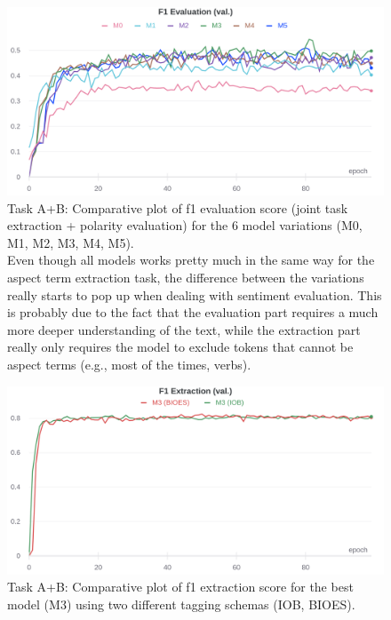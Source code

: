 \documentclass[11pt,a4paper]{article}
\begin{document}
	\begin{figure}[H]
		\centering
		\includegraphics[width=1\columnwidth]{ab_comparative_f1_eval.png}
		\caption{Task A+B: Comparative plot of f1 evaluation score (joint task extraction + polarity evaluation) for the 6 model variations (M0, M1, M2, M3, M4, M5). \\ Even though all models works pretty much in the same way for the aspect term extraction task, the difference between the variations really starts to pop up when dealing with sentiment evaluation. This is probably due to the fact that the evaluation part requires a much more deeper understanding of the text, while the extraction part really only requires the model to exclude tokens that cannot be aspect terms (e.g., most of the times, verbs).}
		\label{fig:comparative_f1_eval}
	\end{figure}
	
	\begin{figure}[H]
		\centering
		\includegraphics[width=1\columnwidth]{M3_ab_IOB_vs_BIOES_f1_extr.png}
		\caption{Task A+B: Comparative plot of f1 extraction score for the best model (M3) using two different tagging schemas (IOB, BIOES).}
		\label{fig:IOB_vs_BIOES_extr}
	\end{figure}
	
\end{document}
